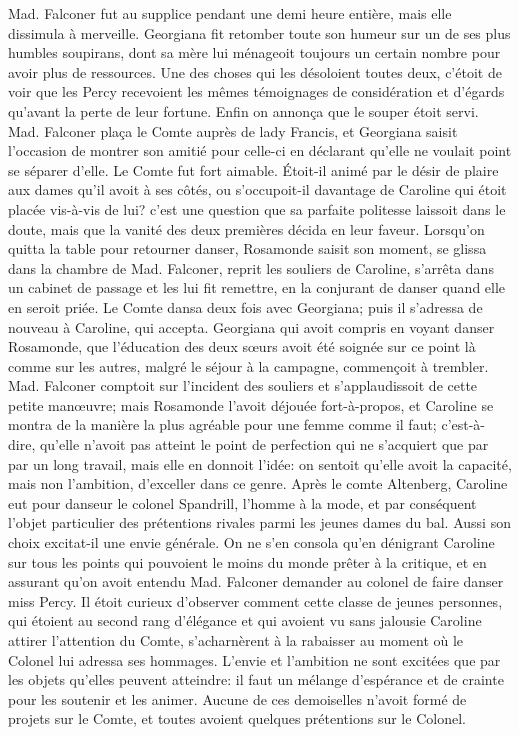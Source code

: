 Mad. Falconer fut au supplice pendant une demi heure entière, mais elle dissimula à merveille. Georgiana fit retomber toute son humeur sur un de ses plus humbles soupirans, dont sa mère lui ménageoit toujours un certain nombre pour avoir plus de ressources. Une des choses qui les désoloient toutes deux, c'étoit de voir que les Percy recevoient les mêmes témoignages de considération et d'égards qu'avant la perte de leur fortune.
Enfin on annonça que le souper étoit servi. Mad. Falconer plaça le Comte auprès de lady Francis, et Georgiana saisit l'occasion de montrer son amitié pour celle-ci en déclarant\setcounter{page}{136} qu'elle ne voulait point se séparer d'elle. Le Comte fut fort aimable. Étoit-il animé par le désir de plaire aux dames qu'il avoit à ses côtés, ou s'occupoit-il davantage de Caroline qui étoit placée vis-à-vis de lui? c'est une question que sa parfaite politesse laissoit dans le doute, mais que la vanité des deux premières décida en leur faveur.
Lorsqu'on quitta la table pour retourner danser, Rosamonde saisit son moment, se glissa dans la chambre de Mad. Falconer, reprit les souliers de Caroline, s'arrêta dans un cabinet de passage et les lui fit remettre, en la conjurant de danser quand elle en seroit priée. Le Comte dansa deux fois avec Georgiana; puis il s'adressa de nouveau à Caroline, qui accepta. Georgiana qui avoit compris en voyant danser Rosamonde, que l'éducation des deux sœurs avoit été soignée sur ce point là comme sur les autres, malgré le séjour à la campagne, commençoit à trembler. Mad. Falconer comptoit sur l'incident des souliers et s'applaudissoit de cette petite manœuvre; mais Rosamonde l'avoit déjouée fort-à-propos, et Caroline se montra de la manière la plus agréable pour une femme comme il faut; c'est-à-dire, qu'elle n'avoit pas atteint le point de perfection qui ne s'acquiert que par\setcounter{page}{137} par un long travail, mais elle en donnoit l’idée: on sentoit qu’elle avoit la capacité, mais non l’ambition, d’exceller dans ce genre.
Après le comte Altenberg, Caroline eut pour danseur le colonel Spandrill, l’homme à la mode, et par conséquent l’objet particulier des prétentions rivales parmi les jeunes dames du bal. Aussi son choix excitat-il une envie générale. On ne s’en consola qu’en dénigrant Caroline sur tous les points qui pouvoient le moins du monde prêter à la critique, et en assurant qu’on avoit entendu Mad. Falconer demander au colonel de faire danser miss Percy. Il étoit curieux d’observer comment cette classe de jeunes personnes, qui étoient au second rang d’élégance et qui avoient vu sans jalousie Caroline attirer l’attention du Comte, s’acharnèrent à la rabaisser au moment où le Colonel lui adressa ses hommages. L’envie et l’ambition ne sont excitées que par les objets qu’elles peuvent atteindre: il faut un mélange d’espérance et de crainte pour les soutenir et les animer. Aucune de ces demoiselles n’avoit formé de projets sur le Comte, et toutes avoient quelques prétentions sur le Colonel.
